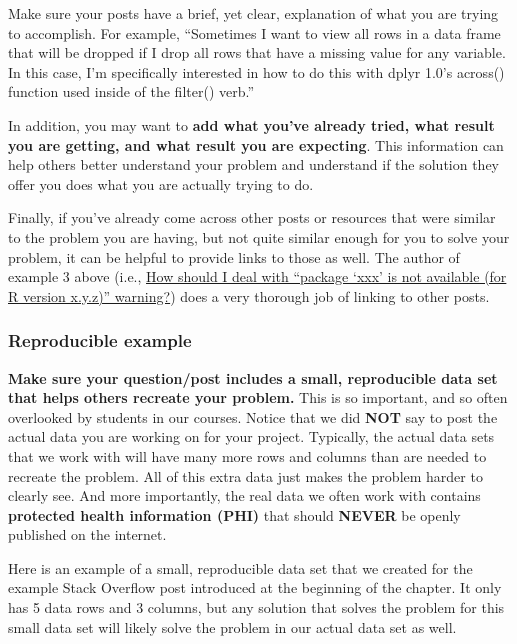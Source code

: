 \documentclass[
  letterpaper,
  DIV=11,
  numbers=noendperiod]{scrreprt}
\begin{document}
Make sure your posts have a brief, yet clear, explanation of what you
are trying to accomplish. For example, ``Sometimes I want to view all
rows in a data frame that will be dropped if I drop all rows that have a
missing value for any variable. In this case, I'm specifically
interested in how to do this with dplyr 1.0's across() function used
inside of the filter() verb.''

In addition, you may want to \textbf{add what you've already tried, what
result you are getting, and what result you are expecting}. This
information can help others better understand your problem and
understand if the solution they offer you does what you are actually
trying to do.

Finally, if you've already come across other posts or resources that
were similar to the problem you are having, but not quite similar enough
for you to solve your problem, it can be helpful to provide links to
those as well. The author of example 3 above (i.e.,
\href{https://stackoverflow.com/questions/25721884/how-should-i-deal-with-package-xxx-is-not-available-for-r-version-x-y-z-wa}{How
should I deal with ``package `xxx' is not available (for R version
x.y.z)'' warning?}) does a very thorough job of linking to other posts.

\subsubsection{Reproducible example}\label{reproducible-example}

\textbf{Make sure your question/post includes a small, reproducible data
set that helps others recreate your problem.} This is so important, and
so often overlooked by students in our courses. Notice that we did
\textbf{NOT} say to post the actual data you are working on for your
project. Typically, the actual data sets that we work with will have
many more rows and columns than are needed to recreate the problem. All
of this extra data just makes the problem harder to clearly see. And
more importantly, the real data we often work with contains
\textbf{protected health information (PHI)} that should \textbf{NEVER}
be openly published on the internet.

Here is an example of a small, reproducible data set that we created for
the example Stack Overflow post introduced at the beginning of the
chapter. It only has 5 data rows and 3 columns, but any solution that
solves the problem for this small data set will likely solve the problem
in our actual data set as well.
\end{document}

